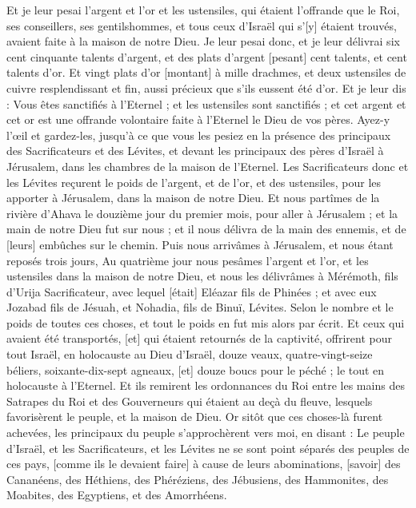 \begin{multicols}{2}
Et je leur pesai l'argent et l'or et les ustensiles, qui étaient l'offrande que le Roi, ses conseillers, ses gentilshommes, et tous ceux d'Israël qui s'[y] étaient trouvés, avaient faite à la maison de notre Dieu.
Je leur pesai donc, et je leur délivrai six cent cinquante talents d'argent, et des plats d'argent [pesant] cent talents, et cent talents d'or.
Et vingt plats d'or [montant] à mille drachmes, et deux ustensiles de cuivre resplendissant et fin, aussi précieux que s'ils eussent été d'or.
Et je leur dis : Vous êtes sanctifiés à l'Eternel ; et les ustensiles sont sanctifiés ; et cet argent et cet or est une offrande volontaire faite à l'Eternel le Dieu de vos pères.
Ayez-y l'œil et gardez-les, jusqu'à ce que vous les pesiez en la présence des principaux des Sacrificateurs et des Lévites, et devant les principaux des pères d'Israël à Jérusalem, dans les chambres de la maison de l'Eternel.
Les Sacrificateurs donc et les Lévites reçurent le poids de l'argent, et de l'or, et des ustensiles, pour les apporter à Jérusalem, dans la maison de notre Dieu.
Et nous partîmes de la rivière d'Ahava le douzième jour du premier mois, pour aller à Jérusalem ; et la main de notre Dieu fut sur nous ; et il nous délivra de la main des ennemis, et de [leurs] embûches sur le chemin.
Puis nous arrivâmes à Jérusalem, et nous étant reposés trois jours,
Au quatrième jour nous pesâmes l'argent et l'or, et les ustensiles dans la maison de notre Dieu, et nous les délivrâmes à Mérémoth, fils d'Urija Sacrificateur, avec lequel [était] Eléazar fils de Phinées ; et avec eux Jozabad fils de Jésuah, et Nohadia, fils de Binuï, Lévites.
Selon le nombre et le poids de toutes ces choses, et tout le poids en fut mis alors par écrit.
Et ceux qui avaient été transportés, [et] qui étaient retournés de la captivité, offrirent pour tout Israël, en holocauste au Dieu d'Israël, douze veaux, quatre-vingt-seize béliers, soixante-dix-sept agneaux, [et] douze boucs pour le péché ; le tout en holocauste à l'Eternel.
Et ils remirent les ordonnances du Roi entre les mains des Satrapes du Roi et des Gouverneurs qui étaient au deçà du fleuve, lesquels favorisèrent le peuple, et la maison de Dieu.
\VerseOne{}Or sitôt que ces choses-là furent achevées, les principaux du peuple s'approchèrent vers moi, en disant : Le peuple d'Israël, et les Sacrificateurs, et les Lévites ne se sont point séparés des peuples de ces pays, [comme ils le devaient faire] à cause de leurs abominations, [savoir] des Cananéens, des Héthiens, des Phéréziens, des Jébusiens, des Hammonites, des Moabites, des Egyptiens, et des Amorrhéens.

\end{multicols}
